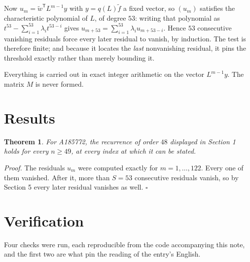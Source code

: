 \documentclass[11pt]{article}
\newtheorem{theorem}{Theorem}
\theoremstyle{definition}
\begin{document}
Now $u_m = \tilde w^{\mathsf T} L^{m-1} y$ with $y = q(L)\tilde f$ a fixed vector, so $(u_m)$ satisfies the characteristic polynomial of $L$, of degree $53$: writing that polynomial as $t^{53} - \sum_{i=1}^{53} \lambda_i t^{53-i}$ gives $u_{m+53} = \sum_{i=1}^{53} \lambda_i u_{m+53-i}$. Hence $53$ consecutive vanishing residuals force every later residual to vanish, by induction. The test is therefore finite; and because it locates the {\itshape last} nonvanishing residual, it pins the threshold exactly rather than merely bounding it.

Everything is carried out in exact integer arithmetic on the vector $L^{m-1}y$. The matrix $M$ is never formed.

\section{Results}

\begin{theorem} For A185772, the recurrence of order $48$ displayed in Section 1 holds for every $n \ge 49$, at every index at which it can be stated.\end{theorem}

{\itshape Proof.} The residuals $u_m$ were computed exactly for $m = 1,\dots,122$. Every one of them vanished. After it, more than $S = 53$ consecutive residuals vanish, so by Section 5 every later residual vanishes as well. $\square$

\section{Verification}

Four checks were run, each reproducible from the code accompanying this note, and the first two are what pin the reading of the entry's English.
\end{document}
